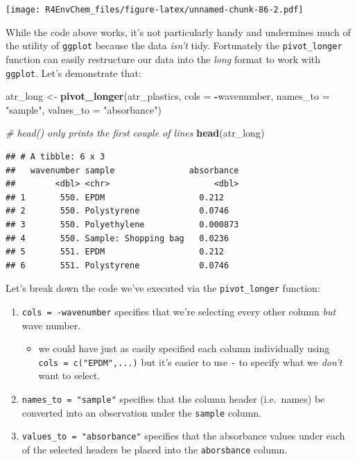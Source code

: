 \documentclass[
]{book}
\newenvironment{Shaded}{\begin{snugshade}}{\end{snugshade}}
\newcommand{\AttributeTok}[1]{\textcolor[rgb]{0.13,0.29,0.53}{#1}}
\newcommand{\CommentTok}[1]{\textcolor[rgb]{0.56,0.35,0.01}{\textit{#1}}}
\newcommand{\FunctionTok}[1]{\textcolor[rgb]{0.13,0.29,0.53}{\textbf{#1}}}
\newcommand{\NormalTok}[1]{#1}
\newcommand{\OtherTok}[1]{\textcolor[rgb]{0.56,0.35,0.01}{#1}}
\newcommand{\SpecialCharTok}[1]{\textcolor[rgb]{0.81,0.36,0.00}{\textbf{#1}}}
\newcommand{\StringTok}[1]{\textcolor[rgb]{0.31,0.60,0.02}{#1}}
\providecommand{\tightlist}{%
  \setlength{\itemsep}{0pt}\setlength{\parskip}{0pt}}
\begin{document}
\texttt{[image: R4EnvChem\_files/figure-latex/unnamed-chunk-86-2.pdf]}

While the code above works, it's not particularly handy and undermines much of the utility of \texttt{ggplot} because the data \emph{isn't} tidy. Fortunately the \texttt{pivot\_longer} function can easily restructure our data into the \emph{long} format to work with \texttt{ggplot}. Let's demonstrate that:

\begin{Shaded}
\begin{Highlighting}[]
\NormalTok{atr\_long }\OtherTok{\textless{}{-}} \FunctionTok{pivot\_longer}\NormalTok{(atr\_plastics, }\AttributeTok{cols =} \SpecialCharTok{{-}}\NormalTok{wavenumber, }
               \AttributeTok{names\_to =} \StringTok{"sample"}\NormalTok{,}
               \AttributeTok{values\_to =} \StringTok{"absorbance"}\NormalTok{)}

\CommentTok{\# head() only prints the first couple of lines}
\FunctionTok{head}\NormalTok{(atr\_long)}
\end{Highlighting}
\end{Shaded}

\begin{verbatim}
## # A tibble: 6 x 3
##   wavenumber sample               absorbance
##        <dbl> <chr>                     <dbl>
## 1       550. EPDM                   0.212   
## 2       550. Polystyrene            0.0746  
## 3       550. Polyethylene           0.000873
## 4       550. Sample: Shopping bag   0.0236  
## 5       551. EPDM                   0.212   
## 6       551. Polystyrene            0.0746
\end{verbatim}

Let's break down the code we've executed via the \texttt{pivot\_longer} function:

\begin{enumerate}
\def\labelenumi{\arabic{enumi}.}
\tightlist
\item
  \texttt{cols\ =\ -wavenumber} specifies that we're selecting every other column \emph{but} wave number.

  \begin{itemize}
  \tightlist
  \item
    we could have just as easily specified each column individually using \texttt{cols\ =\ c("EPDM",...)} but it's easier to use \texttt{-} to specify what we \emph{don't} want to select.
  \end{itemize}
\item
  \texttt{names\_to\ =\ "sample"} specifies that the column header (i.e.~names) be converted into an observation under the \texttt{sample} column.
\item
  \texttt{values\_to\ =\ "absorbance"} specifies that the absorbance values under each of the selected headers be placed into the \texttt{aborsbance} column.
\end{enumerate}
\end{document}
